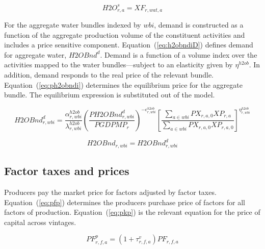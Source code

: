 \documentclass[11pt,letterpaper]{report}
\begin{document}
\begin{equation}
\label{eq:ph2o}
\mathit{H2O}^s_{r,\mathit{a}} = \mathit{XF}_{r,\mathit{wat},\mathit{a}}
\end{equation}

For the aggregate water bundles indexed by $\mathit{wbi}$, demand is constructed
as a function of the aggregate production volume of the constituent activities
and includes a price sensitive component. Equation~(\ref{eq:h2obndiD}) defines
demand for aggregate water, $\mathit{H2OBnd}^d$. Demand is a function of a
volume index over the activities mapped to the water bundles---subject to an
elasticity given by $\eta^{h2ob}$. In addition, demand responds to the real
price of the relevant bundle. Equation~(\ref{eq:ph2obndi}) determines the
equilibrium price for the aggregate bundle. The equilibrium expression is
substituted out of the model.

\begin{equation}
\label{eq:h2obndiD}
\mathit{H2OBnd}^d_{r,\mathit{wbi}} =
   \frac {\displaystyle \alpha^{h2ob}_{r,\mathit{wbi}}}
         {\displaystyle \lambda^{h2ob}_{r,\mathit{wbi}}}
   \left(
      \frac{\mathit{PH2OBnd}^d_{r,\mathit{wbi}}} {\mathit{PGDPMP}_r}
   \right)^{-\epsilon^{h2ob}_{r,\mathit{wbi}}}
   \left[
      \frac {\displaystyle
         \sum_{a \in \mathit{wbi}}{\mathit{PX}_{r,a,0}\mathit{XP}_{r,a}}}
            {\displaystyle
         \sum_{a \in \mathit{wbi}}{\mathit{PX}_{r,a,0}\mathit{XP}_{r,a,0}}}
   \right]^{\eta^{h2ob}_{r,\mathit{wbi}}}
\end{equation}

\begin{equation}
\label{eq:ph2obndi}
\mathit{H2OBnd}_{r,\mathit{wbi}} = \mathit{H2OBnd}^d_{r,\mathit{wbi}}
\end{equation}

\subsection{Factor taxes and prices}

Producers pay the market price for factors adjusted by factor taxes.
Equation~(\ref{eq:pfp}) determines the producers purchase price of factors for
all factors of production. Equation~(\ref{eq:pkp}) is the relevant equation for
the price of capital across vintages.

\begin{equation}
\label{eq:pfp}
\mathit{PF}^p_{r,f,a} =
   \left( 1 + \tau^v_{r,f,a} \right) \mathit{PF}_{r,f,a}
\end{equation}
\end{document}
